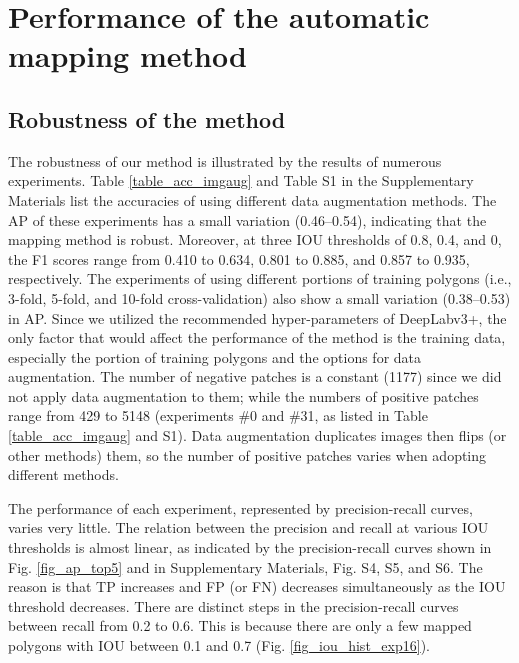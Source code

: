 \documentclass[authoryear,preprint,review,12pt]{elsarticle}
\begin{document}
\section{Performance of the automatic mapping method}
\label{sec_performance}

\subsection{Robustness of the method}
\label{subsec_robustness}

The robustness of our method is illustrated by the results of numerous experiments. Table \ref{table_acc_imgaug} and Table S1 in the Supplementary Materials list the accuracies of using different data augmentation methods. The AP of these experiments has a small variation (0.46--0.54), indicating that the mapping method is robust. Moreover, at three IOU thresholds of 0.8, 0.4, and 0, the F1 scores range from 0.410 to 0.634, 0.801 to 0.885, and 0.857 to 0.935, respectively. The experiments of using different portions of training polygons (i.e., 3-fold, 5-fold, and 10-fold cross-validation) also show a small variation (0.38--0.53) in AP. Since we utilized the recommended hyper-parameters of DeepLabv3+, the only factor that would affect the performance of the method is the training data, especially the portion of training polygons and the options for data augmentation. The number of negative patches is a constant (1177) since we did not apply data augmentation to them; while the numbers of positive patches range from 429 to 5148 (experiments \#0 and \#31, as listed in Table \ref{table_acc_imgaug} and S1). Data augmentation duplicates images then flips (or other methods) them, so the number of positive patches varies when adopting different methods.

The performance of each experiment, represented by precision-recall curves, varies very little. The relation between the precision and recall at various IOU thresholds is almost linear, as indicated by the precision-recall curves shown in Fig. \ref{fig_ap_top5} and  in Supplementary Materials, Fig. S4, S5, and S6. The reason is that TP increases and FP (or FN) decreases simultaneously as the IOU threshold decreases. There are distinct steps in the precision-recall curves between recall from 0.2 to 0.6. This is because there are only a few mapped polygons with IOU between 0.1 and 0.7 (Fig. \ref{fig_iou_hist_exp16}).
\end{document}
